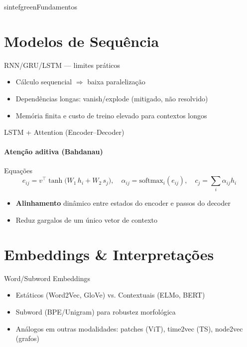 \documentclass{beamer}
\begin{document}
\begin{chapter}{sintefgreen}{Fundamentos}\end{chapter}

\section{Modelos de Sequência}
\begin{frame}{RNN/GRU/LSTM — limites práticos}
	\begin{itemize}[<+->]
		\item Cálculo sequencial $\Rightarrow$ baixa paralelização
		\item Dependências longas: vanish/explode (mitigado, não resolvido)
		\item Memória finita e custo de treino elevado para contextos longos
	\end{itemize}
\end{frame}

\begin{frame}{LSTM + Attention (Encoder--Decoder)}
	\framesubtitle{Atenção aditiva (Bahdanau)}
	\begin{block}{Equações}
		\small
		\[
			e_{ij} = v^\top \tanh\!\big(W_1\,h_i + W_2\,s_j\big), \quad
			\alpha_{ij} = \mathrm{softmax}_i(e_{ij}), \quad
			c_j = \sum_i \alpha_{ij} h_i
		\]
	\end{block}
	\begin{itemize}[<+->]
		\item \textbf{Alinhamento} dinâmico entre estados do encoder e passos do decoder
		\item Reduz gargalos de um único vetor de contexto
	\end{itemize}
\end{frame}

\section{Embeddings \& Interpretações}
\begin{frame}{Word/Subword Embeddings}
	\begin{itemize}[<+->]
		\item Estáticos (Word2Vec, GloVe) vs. Contextuais (ELMo, BERT)
		\item Subword (BPE/Unigram) para robustez morfológica
		\item Análogos em outras modalidades: patches (ViT), time2vec (TS), node2vec (grafos)
	\end{itemize}
\end{frame}
\end{document}
